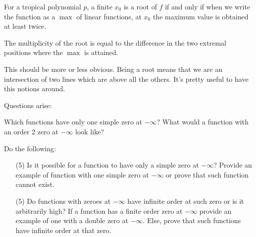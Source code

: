 \documentclass[12pt]{memoir}
\begin{document}
\begin{Lem}
For a tropical polynomial $p$, a finite $x_0$ is a root of $f$ if and only if when we write the function as a $\max$ of linear functions, at $x_0$ the maximum value is obtained at least twice.\par 
The multiplicity of the root is equal to the difference in the two extremal positions where the $\max$ is attained.
\end{Lem}

This should be more or less obvious. Being a root means that we are an intersection of two lines which are above all the others. It's pretty useful to have this notions around.

Questions arise:
\begin{significant}
    Which functions have only one simple zero at $-\infty$? What would a function with an order 2 zero at $-\infty$ look like?
\end{significant}

\begin{Ej}
    Do the following:
    \begin{itemize}
        \item[(5)] Is it possible for a function to have only a simple zero at $-\infty$? Provide an example of function with one simple zero at $-\infty$ or prove that such function cannot exist. 
        \item[(5)] Do functions with zeroes at $-\infty$ have infinite order at such zero or is it arbitrarily high? If a function has a finite order zero at $-\infty$ provide an example of one with a double zero at $-\infty$. Else, prove that such functions have infinite order at that zero.
    \end{itemize}
\end{Ej}


\ifx\nextra\undefined
\printindex
\else\fi
\nocite{*}


\end{document}
